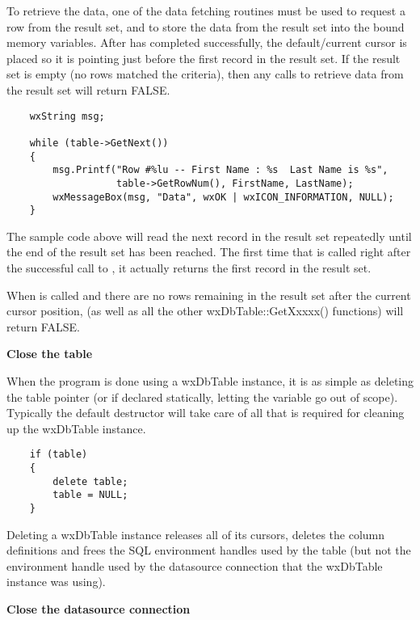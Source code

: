 To retrieve the data, one of the data fetching routines must be used to 
request a row from the result set, and to store the data from the result 
set into the bound memory variables. After  
has completed successfully, the default/current cursor is placed so it 
is pointing just before the first record in the result set. If the 
result set is empty (no rows matched the criteria), then any calls to 
retrieve data from the result set will return FALSE.

\begin{verbatim}
    wxString msg;

    while (table->GetNext())
    {
        msg.Printf("Row #%lu -- First Name : %s  Last Name is %s",
      	           table->GetRowNum(), FirstName, LastName);
        wxMessageBox(msg, "Data", wxOK | wxICON_INFORMATION, NULL);
    }
\end{verbatim}

The sample code above will read the next record in the result set repeatedly 
until the end of the result set has been reached. The first time that 
 is called right after the successful 
call to , it actually returns the first record 
in the result set. 

When  is called and there are 
no rows remaining in the result set after the current cursor position, 
 (as well as all the other 
wxDbTable::GetXxxxx() functions) will return FALSE.

{\bf Close the table}

When the program is done using a wxDbTable instance, it is as simple as 
deleting the table pointer (or if declared statically, letting the 
variable go out of scope). Typically the default destructor will take 
care of all that is required for cleaning up the wxDbTable instance.

\begin{verbatim}
    if (table)
    {
        delete table;
        table = NULL;
    }
\end{verbatim}

Deleting a wxDbTable instance releases all of its cursors, deletes the 
column definitions and frees the SQL environment handles used by the 
table (but not the environment handle used by the datasource connection 
that the wxDbTable instance was using).

{\bf Close the datasource connection}

